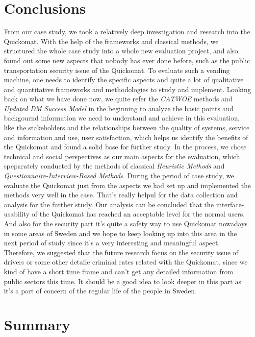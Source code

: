 \documentclass[twocolumn]{article}
\begin{document}
\section{Conclusions}
From our case study, we took a relatively deep investigation and research into the Quickomat. With the help of the frameworks and classical methods, we structured the whole case study into a whole new evaluation project, and also found out some new aspects that nobody has ever done before, such as the public transportation security issue of the Quickomat. To evaluate such a vending machine, one needs to identify the specific aspects and quite a lot of qualitative and quantitative frameworks and methodologies to study and implement. 
Looking back on what we have done now, we quite refer the \emph{CATWOE} methods and \emph{Updated DM Success Model} in the beginning to analyze the basic points and backgournd information we need to understand and achieve in this evaluation, like the stakeholders and the relationships between the quality of systems, service and information and use, user satisfaction, which helps us identify the benefits of the Quickomat and found a solid base for further study. 
In the process, we chose technical and social perspectives as our main aspects for the evaluation, which speparately conducted by the methods of classical \emph{Heuristic Methods} and \emph{Questionnaire-Interview-Based Methods}. During the period of case study, we evaluate the Quickomat just from the aspects we had set up and implemented the methods very well in the case. That's really helpul for the data collection and analysis for the further study. Our analysis can be concluded that the interface-usability of the Quickomat has reached an acceptable level for the normal users. And also for the security part it's quite a safety way to use Quickomat nowadays in some areas of Sweden and we hope to keep looking up into this area in the next period of study since it's a very interesting and meaningful aspect.
Therefore, we suggested that the future research focus on the security issue of drivers or some other detaile criminal rates related with the Quickomat, since we kind of have a short time frame and can't get any detailed information from public sectors this time. It should be a good idea to look deeper in this part as it's a part of concern of the regular life of the people in Sweden.


\section{Summary}

\cite{*}


\end{document}
